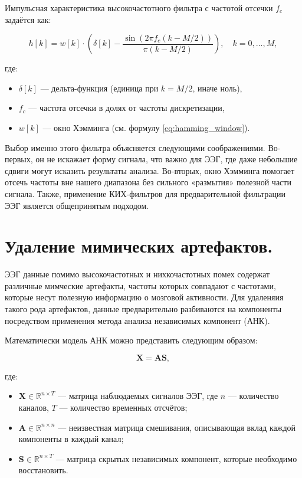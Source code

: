 Импульсная характеристика высокочастотного фильтра с частотой отсечки \(f_c\) задаётся как:

\begin{equation}
h[k] = w[k] \cdot \left( \delta[k] - \frac{\sin(2 \pi f_c (k - M/2))}{\pi (k - M/2)} \right), \quad k = 0, \dots, M,
\label{eq:filter_kernel}
\end{equation}

где:
\begin{itemize}
    \item \(\delta[k]\) — дельта-функция (единица при \(k = M/2\), иначе ноль),
    \item \(f_c\) — частота отсечки в долях от частоты дискретизации,
    \item \(w[k]\) — окно Хэмминга (см. формулу \eqref{eq:hamming_window}).
\end{itemize}

Выбор именно этого фильтра объясняется следующими соображениями. Во-первых, он не искажает форму сигнала, что важно для ЭЭГ, где даже небольшие сдвиги могут исказить результаты анализа. Во-вторых, окно Хэмминга помогает отсечь частоты вне нашего диапазона без сильного «размытия» полезной части сигнала. Также, применение КИХ-фильтров для предварительной фильтрации ЭЭГ является общепринятым подходом.

\section{Удаление мимических артефактов.}
\label{sec:ica}
ЭЭГ данные помимо высокочастотных и нихкочастотных помех содержат различные мимческие артефакты, частоты которых совпадают с частотами, которые несут полезную информацию о мозговой активности. Для удаленяия такого рода артефактов, данные предварительно разбиваются на компоненты посредством применения метода анализа независимых компонент (АНК). 

Математически модель АНК можно представить следующим образом:

\begin{equation}
\mathbf{X} = \mathbf{A} \mathbf{S},
\label{eq:ica_model}
\end{equation}

где:
\begin{itemize}
    \item \(\mathbf{X} \in \mathbb{R}^{n \times T}\) — матрица наблюдаемых сигналов ЭЭГ, где \(n\) — количество каналов, \(T\) — количество временных отсчётов;
    \item \(\mathbf{A} \in \mathbb{R}^{n \times n}\) — неизвестная матрица смешивания, описывающая вклад каждой компоненты в каждый канал;
    \item \(\mathbf{S} \in \mathbb{R}^{n \times T}\) — матрица скрытых независимых компонент, которые необходимо восстановить.
\end{itemize}

